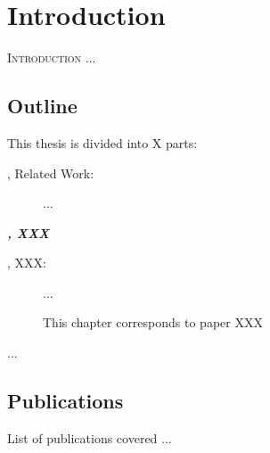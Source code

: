 \chapter{Introduction}
\label{chap:introduction}

\vspace*{-2.2em}
\minitoc
\vspace*{0.8em}

\lettrine[lines=3]{I}{ntroduction}  ...

\section{Outline}

This thesis is divided into X parts:

\begin{description}
	\item[, Related Work:] ...
\end{description}

\noindent\textbf{\textit{, XXX}}

\begin{description}
	\item[, XXX:]
	...
	
	This chapter corresponds to paper XXX
\end{description}

...

\section{Publications}

List of publications covered ...